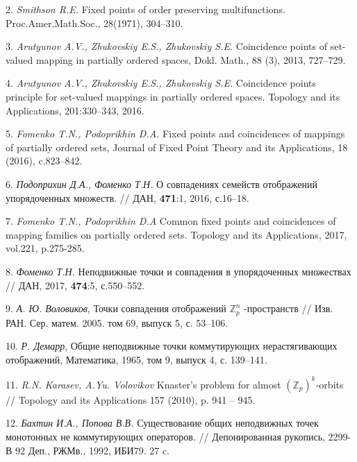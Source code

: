 2. {\it Smithson R.E.} Fixed points of order preserving  multifunctions. Proc.Amer.Math.Soc., 28(1971), 304--310.

3. {\it Arutyunov A.V., Zhukovskiy E.S., Zhukovskiy S.E.} Coincidence points of set-valued mapping in partially ordered spaces, Dokl. Math., 88 (3), 2013, 727--729.

4. {\it Arutyunov A.V., Zhukovskiy E.S., Zhukovskiy S.E.} Coincidence points principle for set-valued mappings in partially ordered spaces. Topology and its Applications, 201:330--343, 2016.

5. {\it Fomenko T.N., Podoprikhin D.A.} Fixed points and coincidences of mappings of partially ordered sets, Journal of Fixed Point Theory and its Applications, 18 (2016), c.823--842.

6. {\it Подоприхин Д.А., Фоменко Т.Н.} О совпадениях семейств отображений  упорядоченных множеств. // ДАН,  {\bf 471}:1, 2016, с.16--18.

7. {\it Fomenko T.N., Podoprikhin D.A} Common fixed points and coincidences of mapping families on partially ordered sets. Topology and its Applications, 2017, vol.221, p.275-285.

8. {\it Фоменко Т.Н.} Неподвижные точки и совпадения в упорядоченных множествах // ДАН, 2017, {\bf 474}:5,  с.550--552.

9. {\it А. Ю. Воловиков}, Точки совпадения отображений $\mathbb Z ^{n}_{p}$ -пространств // Изв. РАН. Сер. матем. 2005. том 69, выпуск 5, с. 53–106.

10. {\it Р. Демарр}, Общие неподвижные точки коммутирующих нерастягивающих отображений, Математика, 1965, том 9, выпуск 4, с. 139–141.

11. {\it R.N. Karasev, A.Yu. Volovikov} Knaster's problem for almost $(\mathbb Z_{p})^{k}$-orbits // Topology and its Applications 157 (2010), p. 941 -- 945.

12. {\it Бахтин И.А., Попова В.В.} Существование общих неподвижных точек монотонных не коммутирующих операторов. // Депонированная рукопись, 2299-В 92 Деп., РЖМв., 1992, ИБИ79. 27 c.


